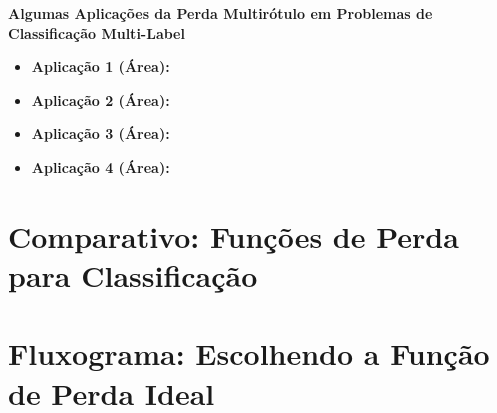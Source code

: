 \textbf{Algumas Aplicações da Perda Multirótulo em Problemas de Classificação Multi-Label}
\vspace{1em}

\begin{itemize}
    \item \textbf{Aplicação 1 (Área):}
    \item \textbf{Aplicação 2 (Área):}
    \item \textbf{Aplicação 3 (Área):}
    \item \textbf{Aplicação 4 (Área):}
\end{itemize}

\section{Comparativo: Funções de Perda para Classificação}

\section{Fluxograma: Escolhendo a Função de Perda Ideal}
